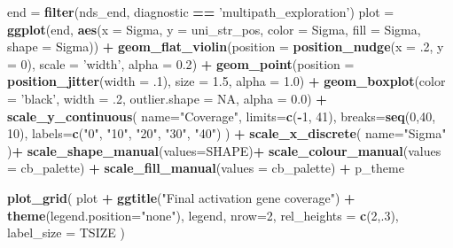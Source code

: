 \documentclass[]{book}
\newenvironment{Shaded}{\begin{snugshade}}{\end{snugshade}}
\newcommand{\DataTypeTok}[1]{\textcolor[rgb]{0.13,0.29,0.53}{#1}}
\newcommand{\DecValTok}[1]{\textcolor[rgb]{0.00,0.00,0.81}{#1}}
\newcommand{\FloatTok}[1]{\textcolor[rgb]{0.00,0.00,0.81}{#1}}
\newcommand{\KeywordTok}[1]{\textcolor[rgb]{0.13,0.29,0.53}{\textbf{#1}}}
\newcommand{\NormalTok}[1]{#1}
\newcommand{\OperatorTok}[1]{\textcolor[rgb]{0.81,0.36,0.00}{\textbf{#1}}}
\newcommand{\OtherTok}[1]{\textcolor[rgb]{0.56,0.35,0.01}{#1}}
\newcommand{\StringTok}[1]{\textcolor[rgb]{0.31,0.60,0.02}{#1}}
\begin{document}
\begin{Shaded}
\begin{Highlighting}[]
\NormalTok{end =}\StringTok{ }\KeywordTok{filter}\NormalTok{(nds_end, diagnostic }\OperatorTok{==}\StringTok{ 'multipath_exploration'}\NormalTok{)}
\NormalTok{plot =}\StringTok{ }\KeywordTok{ggplot}\NormalTok{(end, }\KeywordTok{aes}\NormalTok{(}\DataTypeTok{x =}\NormalTok{ Sigma, }\DataTypeTok{y =}\NormalTok{ uni_str_pos, }\DataTypeTok{color =}\NormalTok{ Sigma, }\DataTypeTok{fill =}\NormalTok{ Sigma, }\DataTypeTok{shape =}\NormalTok{ Sigma)) }\OperatorTok{+}
\StringTok{  }\KeywordTok{geom_flat_violin}\NormalTok{(}\DataTypeTok{position =} \KeywordTok{position_nudge}\NormalTok{(}\DataTypeTok{x =} \FloatTok{.2}\NormalTok{, }\DataTypeTok{y =} \DecValTok{0}\NormalTok{), }\DataTypeTok{scale =} \StringTok{'width'}\NormalTok{, }\DataTypeTok{alpha =} \FloatTok{0.2}\NormalTok{) }\OperatorTok{+}
\StringTok{  }\KeywordTok{geom_point}\NormalTok{(}\DataTypeTok{position =} \KeywordTok{position_jitter}\NormalTok{(}\DataTypeTok{width =} \FloatTok{.1}\NormalTok{), }\DataTypeTok{size =} \FloatTok{1.5}\NormalTok{, }\DataTypeTok{alpha =} \FloatTok{1.0}\NormalTok{) }\OperatorTok{+}
\StringTok{  }\KeywordTok{geom_boxplot}\NormalTok{(}\DataTypeTok{color =} \StringTok{'black'}\NormalTok{, }\DataTypeTok{width =} \FloatTok{.2}\NormalTok{, }\DataTypeTok{outlier.shape =} \OtherTok{NA}\NormalTok{, }\DataTypeTok{alpha =} \FloatTok{0.0}\NormalTok{) }\OperatorTok{+}
\StringTok{  }\KeywordTok{scale_y_continuous}\NormalTok{(}
    \DataTypeTok{name=}\StringTok{"Coverage"}\NormalTok{,}
    \DataTypeTok{limits=}\KeywordTok{c}\NormalTok{(}\OperatorTok{-}\DecValTok{1}\NormalTok{, }\DecValTok{41}\NormalTok{),}
    \DataTypeTok{breaks=}\KeywordTok{seq}\NormalTok{(}\DecValTok{0}\NormalTok{,}\DecValTok{40}\NormalTok{, }\DecValTok{10}\NormalTok{),}
    \DataTypeTok{labels=}\KeywordTok{c}\NormalTok{(}\StringTok{"0"}\NormalTok{, }\StringTok{"10"}\NormalTok{, }\StringTok{"20"}\NormalTok{, }\StringTok{"30"}\NormalTok{, }\StringTok{"40"}\NormalTok{)}
\NormalTok{  ) }\OperatorTok{+}
\StringTok{  }\KeywordTok{scale_x_discrete}\NormalTok{(}
    \DataTypeTok{name=}\StringTok{"Sigma"}
\NormalTok{  )}\OperatorTok{+}
\StringTok{  }\KeywordTok{scale_shape_manual}\NormalTok{(}\DataTypeTok{values=}\NormalTok{SHAPE)}\OperatorTok{+}
\StringTok{  }\KeywordTok{scale_colour_manual}\NormalTok{(}\DataTypeTok{values =}\NormalTok{ cb_palette) }\OperatorTok{+}
\StringTok{  }\KeywordTok{scale_fill_manual}\NormalTok{(}\DataTypeTok{values =}\NormalTok{ cb_palette) }\OperatorTok{+}
\StringTok{  }\NormalTok{p_theme}

\KeywordTok{plot_grid}\NormalTok{(}
\NormalTok{  plot }\OperatorTok{+}
\StringTok{    }\KeywordTok{ggtitle}\NormalTok{(}\StringTok{"Final activation gene coverage"}\NormalTok{) }\OperatorTok{+}
\StringTok{    }\KeywordTok{theme}\NormalTok{(}\DataTypeTok{legend.position=}\StringTok{"none"}\NormalTok{),}
\NormalTok{  legend,}
  \DataTypeTok{nrow=}\DecValTok{2}\NormalTok{,}
  \DataTypeTok{rel_heights =} \KeywordTok{c}\NormalTok{(}\DecValTok{2}\NormalTok{,.}\DecValTok{3}\NormalTok{),}
  \DataTypeTok{label_size =}\NormalTok{ TSIZE}
\NormalTok{)}
\end{Highlighting}
\end{Shaded}
\end{document}

